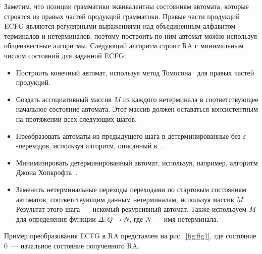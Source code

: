 Заметим, что позиции грамматики эквивалентны состояниям автомата, которые 
строятся из правых частей продукций грамматики. Правые части продукций ECFG являются регулярными
выражениями над объединенным алфавитом терминалов и нетерминалов, поэтому построить по ним автомат можно используя общеизвестные алгоритмы.
Следующий алгоритм строит RA с минимальным числом состояний для заданной ECFG:
\begin{itemize}
	\item Построить конечный автомат, используя метод Томпсона~\cite{Thompson:1968:PTR:363347.363387} для правых
	частей продукций.
	\item Создать ассоциативный массив $M$ из каждого нетерминала в соответствующее начальное состояние автомата.
	Этот массив должен оставаться консистентным на протяжении всех следующих шагов.
	\item Преобразовать автоматы из предыдущего шага в детерминированные без 
	$\varepsilon$-переходов, используя алгоритм, описанный в~\cite{aho1974design}.
	\item Минимизировать детерминированный автомат, используя, например, алгоритм
	Джона Хопкрофта~\cite{hopcroft1971n}.
	\item Заменить нетерминальные переходы переходами по стартовым состояниям автоматов,
	соответствующим данным нетерминалам, используя массив $M$. Результат 
	этого шага~--- искомый рекурсивный автомат. Также используем $M$
	для определения функции $\Delta : Q \to N$, где $N$~--- имя нетерминала.
\end{itemize}
Пример преобразования ECFG в RA представлен на рис.~\ref{fig:fig1}, где состояние
0~--- начальное состояние полученного RA.
